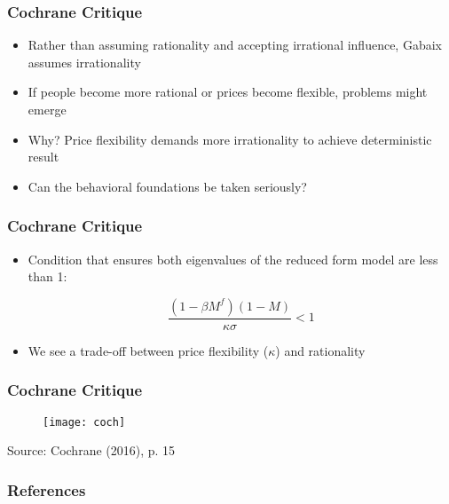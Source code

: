 \documentclass{beamer}
\begin{document}

\begin{frame}
	\frametitle{Cochrane Critique}
	\begin{itemize}
		\item Rather than assuming rationality and accepting irrational influence, Gabaix assumes irrationality 
		\item If people become more rational or prices become flexible, problems might emerge
		\item Why? Price flexibility demands more irrationality to achieve deterministic result
		\item Can the behavioral foundations be taken seriously?
	\end{itemize}
\end{frame}


\begin{frame}
	\frametitle{Cochrane Critique}
	\begin{itemize}
		\item Condition that ensures both eigenvalues of the reduced form model are less than 1:
		\begin{center}
			$$\frac{(1 - \beta M^{f})(1 - M)}{\kappa\sigma} < 1$$
		\end{center}
		\vspace{8pt}
		\item We see a trade-off between price flexibility ($\kappa$) and rationality
	\end{itemize}
\end{frame}

\begin{frame}
	\frametitle{Cochrane Critique}
	\begin{figure}[h]
		\texttt{[image: coch]}
	\end{figure}
	{\footnotesize Source: Cochrane (2016), p. 15}
\end{frame}


\begin{frame}
	\frametitle{References}
\end{frame}

\end{document}
